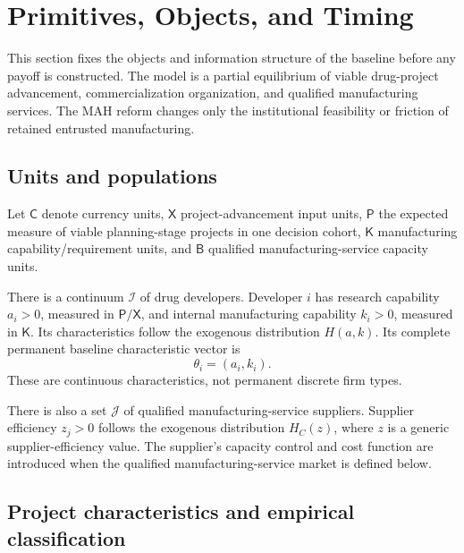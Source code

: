 \section{Primitives, Objects, and Timing}
\label{sec:p01-primitives-timing}

This section fixes the objects and information structure of the baseline before
any payoff is constructed.  The model is a partial equilibrium of
viable drug-project advancement, commercialization organization, and
qualified manufacturing services.  The MAH reform changes only the
institutional feasibility or friction of retained entrusted manufacturing.

\subsection{Units and populations}
\label{subsec:p01-units-populations}

Let \(\mathsf C\) denote currency units, \(\mathsf X\) project-advancement
input units, \(\mathsf P\) the expected measure of viable planning-stage
projects in one decision cohort, \(\mathsf K\) manufacturing
capability/requirement units, and \(\mathsf B\) qualified manufacturing-service
capacity units.

There is a continuum \(\mathcal I\) of drug developers.  Developer \(i\) has research capability \(a_i>0\), measured in \(\mathsf P/\mathsf X\), and
internal manufacturing capability \(k_i>0\), measured in \(\mathsf K\).  Its
characteristics follow the exogenous distribution \(H(a,k)\). Its complete
permanent baseline characteristic vector is
\begin{equation}
  \theta_i=(a_i,k_i).
  \label{eq:p01-developer-type}
\end{equation}
These are continuous characteristics, not permanent discrete firm types.

There is also a set \(\mathcal J\) of qualified manufacturing-service
suppliers.  Supplier efficiency \(z_j>0\) follows the exogenous distribution
\(H_C(z)\), where \(z\) is a generic supplier-efficiency value.  The supplier's capacity control and cost function are introduced
when the qualified manufacturing-service market is defined below.

\subsection{Project characteristics and empirical classification}
\label{subsec:p01-projects}

